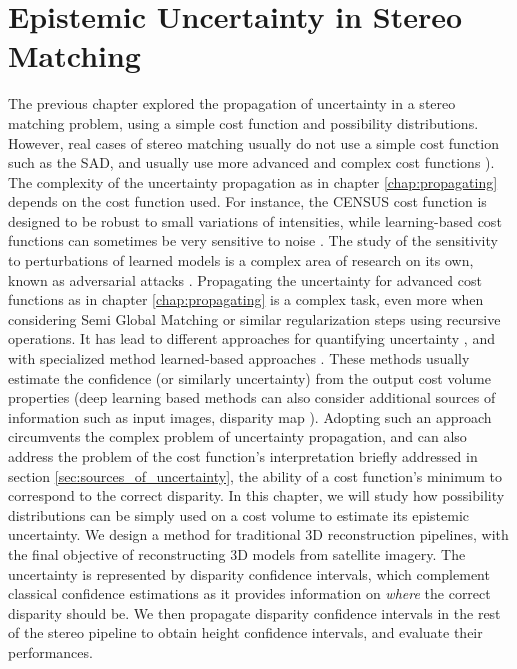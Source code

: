 \chapter{Epistemic Uncertainty in Stereo Matching}\label{chap:epistemic_uncertainty}
The previous chapter explored the propagation of uncertainty in a stereo matching problem, using a simple cost function and possibility distributions. However, real cases of stereo matching usually do not use a simple cost function such as the SAD, and usually use more advanced and complex cost functions \cite{zabih_non-parametric_1994,zbontar_stereo_2016,laga_survey_2022}). The complexity of the uncertainty propagation as in chapter \ref{chap:propagating} depends on the cost function used. For instance, the CENSUS cost function \cite{zabih_non-parametric_1994} is designed to be robust to small variations of intensities, while learning-based cost functions can sometimes be very sensitive to noise \cite{szegedy_intriguing_2013,carlini_towards_2017}. The study of the sensitivity to perturbations of learned models is a complex area of research on its own, known as adversarial attacks \cite{chen_shapeshifter_2018, zhao_seeing_2019}. Propagating the uncertainty for advanced cost functions as in chapter \ref{chap:propagating} is a complex task, even more when considering Semi Global Matching or similar regularization steps using recursive operations. It has lead to different approaches for quantifying uncertainty \cite{hu_quantitative_2012}, and with specialized method learned-based approaches \cite{laga_survey_2022,poggi_confidence_2021,wang_uncertainty_2022}. These methods usually estimate the confidence (or similarly uncertainty) from the output cost volume properties (deep learning based methods can also consider additional sources of information such as input images, disparity map \etc). Adopting such an approach circumvents the complex problem of uncertainty propagation, and can also address the problem of the cost function's interpretation briefly addressed in section \ref{sec:sources_of_uncertainty}, \ie the ability of a cost function's minimum to correspond to the correct disparity. In this chapter, we will study how possibility distributions can be simply used on a cost volume to estimate its epistemic uncertainty. We design a method for traditional 3D reconstruction pipelines, with the final objective of reconstructing 3D models from satellite imagery. The uncertainty is represented by disparity confidence intervals, which complement classical confidence estimations as it provides information on \textit{where} the correct disparity should be. We then propagate disparity confidence intervals in the rest of the stereo pipeline to obtain height confidence intervals, and evaluate their performances.

